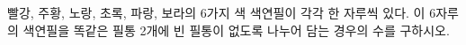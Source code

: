 빨강, 주황, 노랑, 초록, 파랑, 보라의 6가지 색 색연필이 각각 한 자루씩 있다. 이 6자루의 색연필을 똑같은 필통 2개에 빈 필통이 없도록 나누어 담는 경우의 수를 구하시오.
